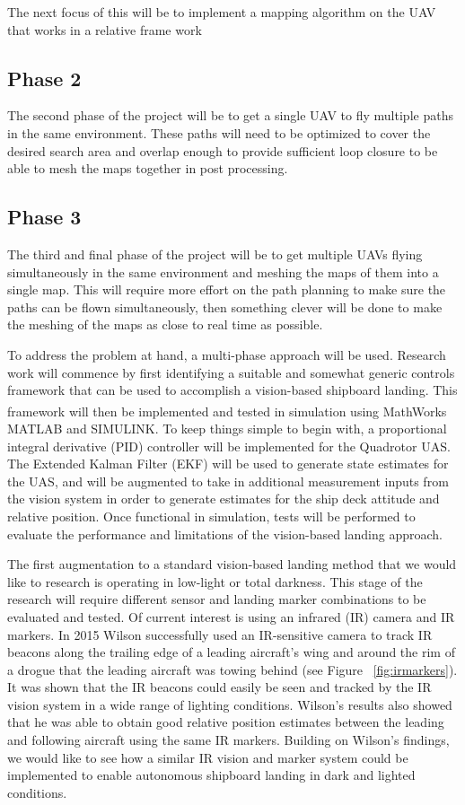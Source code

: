 \documentclass[12pt, letterpaper]{article}
\begin{document}
The next focus of this will be to implement a mapping algorithm on the UAV that works in a relative frame work 

\subsection{Phase 2}
The second phase of the project will be to get a single UAV to fly multiple paths in the same environment. These paths will need to be optimized to cover the desired search area and overlap enough to provide sufficient loop closure to be able to mesh the maps together in post processing. 

\subsection{Phase 3}
The third and final phase of the project will be to get multiple UAVs flying simultaneously in the same environment and meshing the maps of them into a single map. This will require more effort on the path planning to make sure the paths can be flown simultaneously, then something clever will be done to make the meshing of the maps as close to real time as possible. 

To address the problem at hand, a multi-phase approach will be used.  Research work will commence by first identifying a suitable and somewhat generic controls framework that can be used to accomplish a vision-based shipboard landing.  This framework will then be implemented and tested in simulation using MathWorks\textsuperscript{\textregistered} MATLAB and SIMULINK.  To keep things simple to begin with, a proportional integral derivative (PID) controller will be implemented for the Quadrotor UAS.  The Extended Kalman Filter (EKF) will be used to generate state estimates for the UAS, and will be augmented to take in additional measurement inputs from the vision system in order to generate estimates for the ship deck attitude and relative position.  Once functional in simulation, tests will be performed to evaluate the performance and limitations of the vision-based landing approach.

The first augmentation to a standard vision-based landing method that we would like to research is operating in low-light or total darkness.  This stage of the research will require different sensor and landing marker combinations to be evaluated and tested.  Of current interest is using an infrared (IR) camera and IR markers.  In 2015 Wilson \cite{Hornung,Hornung2013} successfully used an IR-sensitive camera to track IR beacons along the trailing edge of a leading aircraft's wing and around the rim of a drogue that the leading aircraft was towing behind (see Figure ~\ref{fig:irmarkers}).  It was shown that the IR beacons could easily be seen and tracked by the IR vision system in a wide range of lighting conditions.  Wilson's results also showed that he was able to obtain good relative position estimates between the leading and following aircraft using the same IR markers.  Building on Wilson's findings, we would like to see how a similar IR vision and marker system could be implemented to enable autonomous shipboard landing in dark and lighted conditions. 
\end{document}
